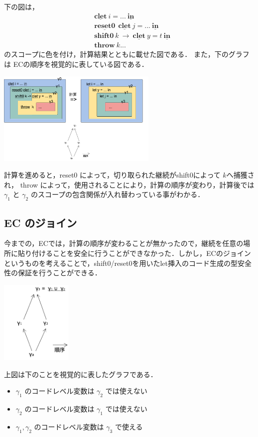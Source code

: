 \documentclass[10pt,a4j,twocolumn]{jarticle}
\newcommand\Shiftz{\textbf{shift0}}
\newcommand\Throw{\textbf{throw}}
\newcommand\cResetz{\underline{\textbf{reset0}}}
\newcommand\cLet{\underline{\textbf{clet}}}
\newcommand\cIn{\underline{\textbf{in}}}
\theoremstyle{definition}
\begin{document}
下の図は，
\begin{align*}
  & \cLet~ i = ...~\cIn \\
  & \cResetz ~~\cLet~ j = ...~\cIn \\
  & \Shiftz~ k~ \to~ \cLet~y=t~\cIn \\
  & \Throw~ k ...
\end{align*}
のスコープに色を付け，計算結果とともに載せた図である．
また，下のグラフは ECの順序を視覚的に表している図である．

\begin{center}
  \includegraphics[clip,height=4.5cm]{../img/resume_ecex.png}
\end{center}
計算を進めると，reset0 によって，切り取られた継続がshift0によって $k$へ捕獲され， throw によって，使用されることにより，計算の順序が変わり，計算後では$\gamma_1$ と $\gamma_2$ のスコープの包含関係が入れ替わっている事がわかる．

\subsection{EC のジョイン}
今までの，ECでは，計算の順序が変わることが無かったので，継続を任意の場所に貼り付けることを安全に行うことができなかった．しかし，ECのジョインというものを考えることで，shift0/reset0を用いたlet挿入のコード生成の型安全性の保証を行うことができる．

\begin{center}
  \includegraphics[clip,height=4cm]{../img/ecgraph.png}
\end{center}

上図は下のことを視覚的に表したグラフである．
\begin{itemize}
\item $\gamma_1$ のコードレベル変数は $\gamma_2$ では使えない
\item $\gamma_2$ のコードレベル変数は $\gamma_1$ では使えない
\item $\gamma_1, \gamma_2$ のコードレベル変数は $\gamma_3$ で使える
\end{itemize}
\end{document}
